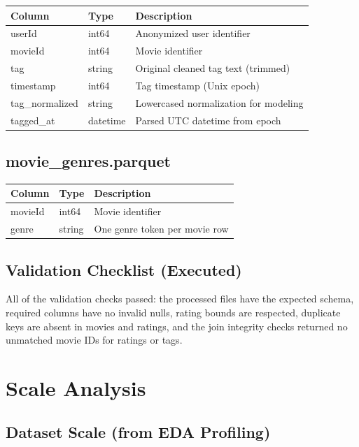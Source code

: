 \documentclass[11pt]{article}
\begin{document}
\begin{longtable}{@{}p{}p{}p{}@{}}
\toprule
\textbf{Column} & \textbf{Type} & \textbf{Description} \\
\midrule
\endhead
userId & int64 & Anonymized user identifier \\
movieId & int64 & Movie identifier \\
tag & string & Original cleaned tag text (trimmed) \\
timestamp & int64 & Tag timestamp (Unix epoch) \\
tag\_normalized & string & Lowercased normalization for modeling \\
tagged\_at & datetime & Parsed UTC datetime from epoch \\
\bottomrule
\end{longtable}

\subsection{movie\_genres.parquet}

\begin{longtable}{@{}p{}p{}p{}@{}}
\toprule
\textbf{Column} & \textbf{Type} & \textbf{Description} \\
\midrule
\endhead
movieId & int64 & Movie identifier \\
genre & string & One genre token per movie row \\
\bottomrule
\end{longtable}

\subsection{Validation Checklist (Executed)}

All of the validation checks passed: the processed files have the expected schema, required columns have no invalid nulls, rating bounds are respected, duplicate keys are absent in movies and ratings, and the join integrity checks returned no unmatched movie IDs for ratings or tags.

\section{Scale Analysis}

\subsection{Dataset Scale (from EDA Profiling)}
\end{document}
